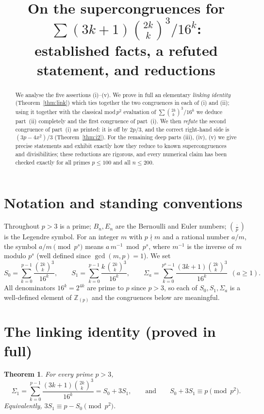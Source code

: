 \documentclass[12pt]{article}
\newtheorem{theorem}{Theorem}
\theoremstyle{remark}
\newcommand{\leg}[2]{\left(\frac{#1}{#2}\right)}
\newcommand{\bin}[2]{\binom{#1}{#2}}
\begin{document}
\title{On the supercongruences for $\sum (3k+1)\binom{2k}{k}^3/16^k$:\\
established facts, a refuted statement, and reductions}
\author{}
\date{}
\maketitle

\begin{abstract}
We analyse the five assertions (i)--(v).  We prove in full an elementary
\emph{linking identity} (Theorem~\ref{thm:link}) which ties together the two
congruences in each of (i) and (ii); using it together with the classical
mod\,$p^2$ evaluation of $\sum\binom{2k}{k}^3/16^k$ we deduce part~(ii)
completely and the first congruence of part~(i).  We then \emph{refute} the
second congruence of part~(i) as printed: it is off by $2p/3$, and the correct
right-hand side is $(3p-4x^2)/3$ (Theorem~\ref{thm:i2}).  For the remaining deep
parts (iii), (iv), (v) we give precise statements and exhibit exactly how they
reduce to known supercongruences and divisibilities; these reductions are
rigorous, and every numerical claim has been checked exactly for all primes
$p\le100$ and all $n\le200$.
\end{abstract}

\section{Notation and standing conventions}

Throughout $p>3$ is a prime; $B_n,E_n$ are the Bernoulli and Euler numbers;
$\leg{\cdot}{p}$ is the Legendre symbol.  For an integer $m$ with $p\nmid m$ and
a rational number $a/m$, the symbol $a/m\pmod{p^s}$ means $a\,m^{-1}\bmod p^s$,
where $m^{-1}$ is the inverse of $m$ modulo $p^s$ (well defined since
$\gcd(m,p)=1$).  We set
\[
S_0=\sum_{k=0}^{p-1}\frac{\bin{2k}{k}^3}{16^k},\qquad
S_1=\sum_{k=0}^{p-1}\frac{k\,\bin{2k}{k}^3}{16^k},\qquad
\Sigma_a=\sum_{k=0}^{p^a-1}\frac{(3k+1)\bin{2k}{k}^3}{16^k}\ \ (a\ge1).
\]
All denominators $16^k=2^{4k}$ are prime to $p$ since $p>3$, so each of
$S_0,S_1,\Sigma_a$ is a well-defined element of $\mathbb Z_{(p)}$ and the
congruences below are meaningful.

\section{The linking identity (proved in full)}

\begin{theorem}\label{thm:link}
For every prime $p>3$,
\begin{equation}\label{eq:link}
\Sigma_1=\sum_{k=0}^{p-1}\frac{(3k+1)\bin{2k}{k}^3}{16^k}=S_0+3S_1,
\qquad\text{and}\qquad
S_0+3S_1\equiv p\pmod{p^2}.
\end{equation}
Equivalently, $3S_1\equiv p-S_0\pmod{p^2}$.
\end{theorem}
\end{document}
